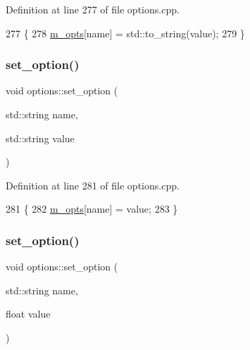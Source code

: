 Definition at line 277 of file options.\+cpp.


\begin{DoxyCode}
277                                                    \{
278   \hyperlink{classoptions_ac73507ca925d98ee5ff6f04937dff5c3}{m\_opts}[name] = std::to\_string(value);
279 \}
\end{DoxyCode}
\mbox{\label{classoptions_a6f76ed6506014e816802739221cfbc20}} 
\subsubsection{\texorpdfstring{set\+\_\+option()}{set\_option()}\hspace{0.1cm}{\footnotesize\ttfamily [3/5]}}
{\footnotesize\ttfamily void options\+::set\+\_\+option (\begin{DoxyParamCaption}\item[{std\+::string}]{name,  }\item[{std\+::string}]{value }\end{DoxyParamCaption})}



Definition at line 281 of file options.\+cpp.


\begin{DoxyCode}
281                                                         \{
282   \hyperlink{classoptions_ac73507ca925d98ee5ff6f04937dff5c3}{m\_opts}[name] = value;
283 \}
\end{DoxyCode}
\mbox{\label{classoptions_a076c522b99fc0816c695c7405e1ae9b9}} 
\subsubsection{\texorpdfstring{set\+\_\+option()}{set\_option()}\hspace{0.1cm}{\footnotesize\ttfamily [4/5]}}
{\footnotesize\ttfamily void options\+::set\+\_\+option (\begin{DoxyParamCaption}\item[{std\+::string}]{name,  }\item[{float}]{value }\end{DoxyParamCaption})}



